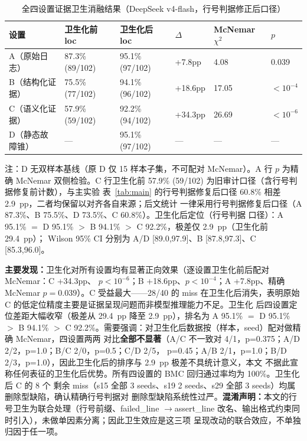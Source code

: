 \documentclass[twocolumn,10pt]{ctexart}
\begin{document}
\begin{table}[t]
\centering
\caption{全四设置证据卫生消融结果（DeepSeek v4-flash，行号判据修正后口径）}\label{tab:hygiene_full}
\scriptsize
\setlength{\tabcolsep}{2pt}
\renewcommand{\arraystretch}{1.12}
\begin{tabular}{p{}p{}p{}p{}p{}p{}}
\toprule
设置 & 卫生化前 loc & 卫生化后 loc & $\Delta$ & McNemar $\chi^2$ & $p$ \\
\midrule
A（原始日志）    & 87.3\% (89/102) & 95.1\% (97/102)  & +7.8pp & 4.08  & 0.039 \\
B（结构化证据）  & 75.5\% (77/102) & 94.1\% (96/102) & +18.6pp & 17.05 & $<\!10^{-4}$ \\
C（语义化证据）  & 57.9\% (59/102) & 92.2\% (94/102) & +34.3pp & 26.69 & $<\!10^{-6}$ \\
D（静态故障锥）  & ---             & 95.1\% (97/102) & ---     & ---   & --- \\
\bottomrule
\end{tabular}
\smallskip

{\footnotesize 注：D 无双样本基线（原 D 仅 15 样本子集，不可配对 McNemar）。A 行 $p$ 为精确
McNemar 双侧检验。C 行卫生化前 57.9\% (59/102) 为旧审计口径（含行号判据修复前计数），与主实验
表~\ref{tab:main} 的行号判据修复后口径 60.8\% 相差 2.9~pp，二者均保留以对齐各自来源；后文统计
一律采用行号判据修复后口径（A 87.3\%、B 75.5\%、D 73.5\%、C 60.8\%）。卫生化后定位（行号判据
口径）：A 95.1\% $=$ D 95.1\% $>$ B 94.1\% $>$ C 92.2\%，极差仅 2.9~pp（卫生化前 29.4~pp）；
Wilson 95\% CI 分别为 A/D [89.0,97.9]、B [87.8,97.3]、C [85.3,96.0]。}
\end{table}

\textbf{主要发现：}卫生化对所有设置均有显著正向效果（逐设置卫生化前后配对 McNemar：C +34.3pp、
$p<10^{-6}$；B +18.6pp、$p<10^{-4}$；A +7.8pp、精确 McNemar $p=0.039$）。C 受益最大——28/40
的 miss 在卫生化后消失，表明原始 C 的低定位精度主要是证据呈现问题而非模型推理能力不足。卫生化
后四设置定位差距大幅收窄（极差从 29.4~pp 降至 2.9~pp），排名为 A 95.1\% $=$ D 95.1\% $>$
B 94.1\% $>$ C 92.2\%。需要强调：对卫生化后数据按（样本，seed）配对做精确 McNemar，四设置两两
对比\textbf{全部不显著}（A/C 不一致对 4/1，p=0.375；A/D 2/2，p=1.0；B/C 2/0，p=0.5；C/D 2/5，
p=0.45；A/B 2/1，p=1.0；B/D 2/3，p=1.0），因此卫生化后的排序与 2.9~pp 极差不具统计意义，本文
不据此宣称任何表征的卫生化后优势。所有四设置的 BMC 回归通过率均为 100\%。卫生化后 C 的 8 个
剩余 miss（s15 全部 3 seeds、s19 2 seeds、s29 全部 3 seeds）均属删除型缺陷，确认精确行号判据对
删除型缺陷系统性过严。\textbf{混淆声明：}本文的行号卫生为联合处理（行号前缀、failed\_line
$\rightarrow$assert\_line 改名、输出格式约束同时引入），未做单因素分离；因此卫生效应是这三项
呈现改动的联合效应，不单独归因于任一项。
\end{document}

